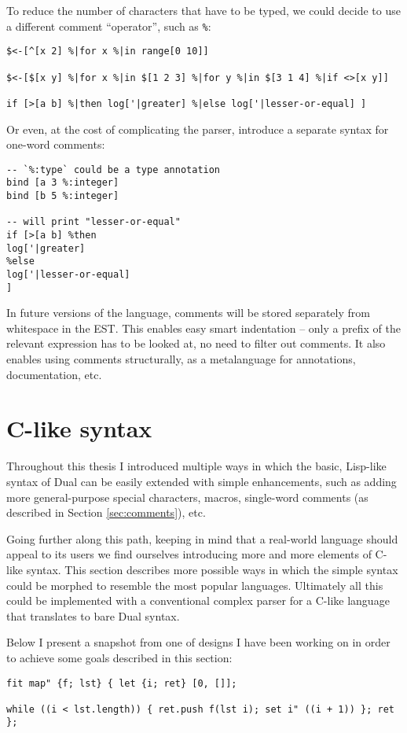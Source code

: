 To reduce the number of characters that have to be typed, we could decide to use
a different comment ``operator'', such as \texttt{\%}:
\begin{lstlisting}
$<-[^[x 2] %|for x %|in range[0 10]]

$<-[$[x y] %|for x %|in $[1 2 3] %|for y %|in $[3 1 4] %|if <>[x y]]

if [>[a b] %|then log['|greater] %|else log['|lesser-or-equal] ]
\end{lstlisting}

Or even, at the cost of complicating the parser, introduce a separate syntax for
one-word comments:
\begin{lstlisting}
-- `%:type` could be a type annotation
bind [a 3 %:integer]
bind [b 5 %:integer]

-- will print "lesser-or-equal"
if [>[a b] %then
log['|greater]
%else
log['|lesser-or-equal]
]
\end{lstlisting}

In future versions of the language, comments will be stored separately from
whitespace in the EST. This enables easy smart indentation -- only a prefix of
the relevant expression has to be looked at, no need to filter out comments. It
also enables using comments structurally, as a metalanguage for annotations,
documentation, etc.

\section{C-like syntax}
Throughout this thesis I introduced multiple ways in which the basic, Lisp-like
syntax of Dual can be easily extended with simple enhancements, such as adding
more general-purpose special characters, macros, single-word comments (as
described in Section \ref{sec:comments}), etc.

Going further along this path, keeping in mind that a real-world language should
appeal to its users we find ourselves introducing more and more elements of
C-like syntax. This section describes more possible ways in which the simple
syntax could be morphed to resemble the most popular languages.  Ultimately all
this could be implemented with a conventional complex parser for a C-like
language that translates to bare Dual syntax.

Below I present a snapshot from one of designs I have been working on in order
to achieve some goals described in this section:
\begin{lstlisting}
fit map" {f; lst} { let {i; ret} [0, []];

while ((i < lst.length)) { ret.push f(lst i); set i" ((i + 1)) }; ret };
\end{lstlisting}


